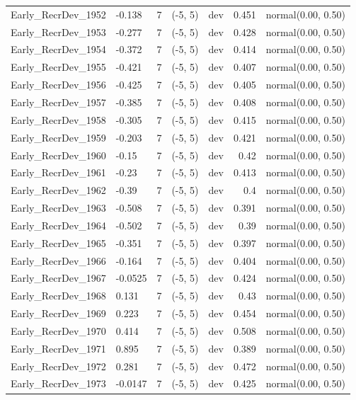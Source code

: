 \documentclass[
]{scrartcl}
\begin{document}
\begin{longtable}{llrllrl}
Early\_RecrDev\_1952 & -0.138 & 7 & (-5, 5) & dev & 0.451 & normal(0.00, 0.50) \\ 
Early\_RecrDev\_1953 & -0.277 & 7 & (-5, 5) & dev & 0.428 & normal(0.00, 0.50) \\ 
Early\_RecrDev\_1954 & -0.372 & 7 & (-5, 5) & dev & 0.414 & normal(0.00, 0.50) \\ 
Early\_RecrDev\_1955 & -0.421 & 7 & (-5, 5) & dev & 0.407 & normal(0.00, 0.50) \\ 
Early\_RecrDev\_1956 & -0.425 & 7 & (-5, 5) & dev & 0.405 & normal(0.00, 0.50) \\ 
Early\_RecrDev\_1957 & -0.385 & 7 & (-5, 5) & dev & 0.408 & normal(0.00, 0.50) \\ 
Early\_RecrDev\_1958 & -0.305 & 7 & (-5, 5) & dev & 0.415 & normal(0.00, 0.50) \\ 
Early\_RecrDev\_1959 & -0.203 & 7 & (-5, 5) & dev & 0.421 & normal(0.00, 0.50) \\ 
Early\_RecrDev\_1960 & -0.15 & 7 & (-5, 5) & dev & 0.42 & normal(0.00, 0.50) \\ 
Early\_RecrDev\_1961 & -0.23 & 7 & (-5, 5) & dev & 0.413 & normal(0.00, 0.50) \\ 
Early\_RecrDev\_1962 & -0.39 & 7 & (-5, 5) & dev & 0.4 & normal(0.00, 0.50) \\ 
Early\_RecrDev\_1963 & -0.508 & 7 & (-5, 5) & dev & 0.391 & normal(0.00, 0.50) \\ 
Early\_RecrDev\_1964 & -0.502 & 7 & (-5, 5) & dev & 0.39 & normal(0.00, 0.50) \\ 
Early\_RecrDev\_1965 & -0.351 & 7 & (-5, 5) & dev & 0.397 & normal(0.00, 0.50) \\ 
Early\_RecrDev\_1966 & -0.164 & 7 & (-5, 5) & dev & 0.404 & normal(0.00, 0.50) \\ 
Early\_RecrDev\_1967 & -0.0525 & 7 & (-5, 5) & dev & 0.424 & normal(0.00, 0.50) \\ 
Early\_RecrDev\_1968 & 0.131 & 7 & (-5, 5) & dev & 0.43 & normal(0.00, 0.50) \\ 
Early\_RecrDev\_1969 & 0.223 & 7 & (-5, 5) & dev & 0.454 & normal(0.00, 0.50) \\ 
Early\_RecrDev\_1970 & 0.414 & 7 & (-5, 5) & dev & 0.508 & normal(0.00, 0.50) \\ 
Early\_RecrDev\_1971 & 0.895 & 7 & (-5, 5) & dev & 0.389 & normal(0.00, 0.50) \\ 
Early\_RecrDev\_1972 & 0.281 & 7 & (-5, 5) & dev & 0.472 & normal(0.00, 0.50) \\ 
Early\_RecrDev\_1973 & -0.0147 & 7 & (-5, 5) & dev & 0.425 & normal(0.00, 0.50) \\ 

\end{longtable}
\end{document}
